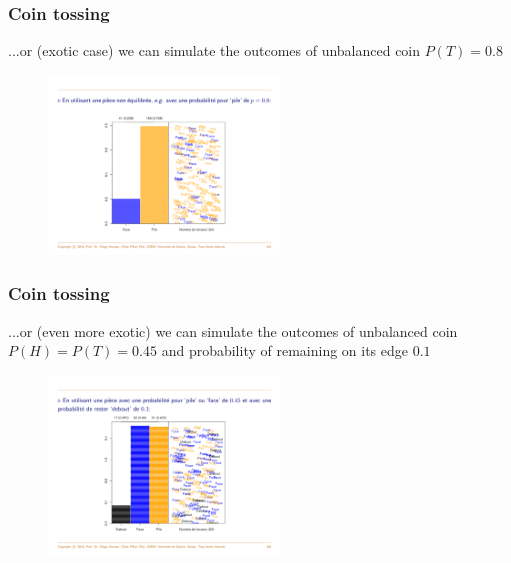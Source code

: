 \documentclass[notes=show,smaller,handout]{beamer}
\begin{document}
\begin{frame}
\frametitle{Coin tossing}

...or (exotic case) we can simulate the outcomes of unbalanced coin $P(T)=0.8$

\begin{center} %
\begin{figure}[ptb]\centering
\includegraphics[width=0.55\textwidth,height=0.6\textheight]{sim7.pdf}
\end{figure}
\end{center}



\end{frame}


\begin{frame}
\frametitle{Coin tossing}

...or (even more exotic) we can simulate the outcomes of unbalanced coin $P(H)=P(T)=0.45$ and probability of remaining
 on its edge $0.1$


\begin{center} %
\begin{figure}[ptb]\centering
\includegraphics[width=0.55\textwidth,height=0.6\textheight]{sim8.pdf}
\end{figure}
\end{center}



\end{frame}
\end{document}
